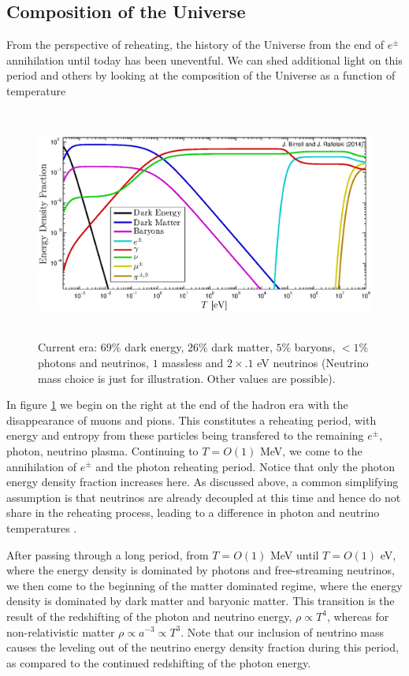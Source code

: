 \subsection{Composition of the Universe}
From the perspective of reheating, the history of the Universe from the end of $e^\pm$ annihilation until today has been uneventful.  We can shed additional light on this period and others by looking at the composition of the Universe as a function of temperature

\begin{figure}
\centerline{\hspace*{0.4cm}\includegraphics[height=7.6cm]{03-birrell/ErasOfUniverse/energy_densities_total.eps}}\label{fig:energy_frac}
\caption{Current era: $69\%$ dark energy, $26\%$ dark matter, $5\%$ baryons, $<1\%$ photons and neutrinos, $1$ massless and $2\times .1$ eV neutrinos (Neutrino mass choice is just for illustration.  Other values are possible).}
 \end{figure}
In figure \ref{fig:energy_frac} we begin on the right at the end of the hadron era with the disappearance of muons and pions.  This constitutes a reheating period, with energy and entropy from these particles being transfered to the remaining $e^\pm$, photon, neutrino plasma.  Continuing to $T=O(1)$ MeV, we come to the annihilation  of $e^\pm$ and the photon reheating period.  Notice that only the photon energy density fraction increases here.  As discussed above, a common simplifying assumption is that neutrinos are already decoupled at this time and hence do not share in the reheating process, leading to a difference in photon and neutrino temperatures .

After passing through a long period, from $T=O(1)$ MeV until $T=O(1)$ eV, where the energy density is dominated by photons and free-streaming neutrinos, we then come to the beginning of the matter dominated regime, where the energy density is dominated by dark matter and baryonic matter.  This transition is the result of the redshifting of the photon and neutrino energy, $\rho\propto T^4$, whereas for non-relativistic matter $\rho\propto a^{-3}\propto T^3$.  Note that our inclusion of neutrino mass causes the leveling out of the neutrino energy density fraction during this period, as compared to the continued redshifting of the photon energy.

